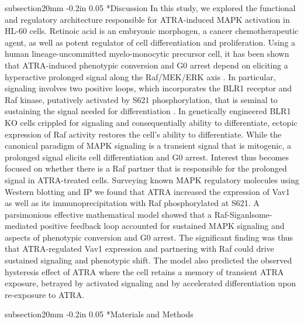 \documentclass[12pt]{article}
\makeatletter
\renewcommand\section{\@startsection
	{subsection}{2}{0mm}
	{-0.2in}
	{0.05\baselineskip}
	{\normalfont\large\bfseries}}
\makeatother
\begin{document}
\section*{Discussion}
In this study, we explored the functional and regulatory architecture responsible for ATRA-induced MAPK activation in HL-60 cells.
Retinoic acid is an embryonic morphogen, a cancer chemotherapeutic agent, as well as potent regulator of cell differentiation and proliferation. 
Using a human lineage-uncommitted myelo-monocytic precursor cell, 
it has been shown that ATRA-induced phenotypic conversion and G0 arrest depend on eliciting a hyperactive prolonged signal along the Raf/MEK/ERK axis \cite{Yen1998}. 
In particular, signaling involves two positive loops, which incorporates the BLR1 receptor and Raf kinase, putatively activated by S621 phosphorylation, 
that is seminal to sustaining the signal needed for differentiation \cite{Wang2008}. 
In genetically engineered BLR1 KO cells crippled for signaling and consequentially ability to differentiate, ectopic expression of Raf activity restores the cell's ability to differentiate. 
While the canonical paradigm of MAPK signaling is a transient signal that is mitogenic, a prolonged signal elicits cell differentiation and G0 arrest. 
Interest thus becomes focused on whether there is a Raf partner that is responsible for the prolonged signal in ATRA-treated cells. 
Surveying known MAPK regulatory molecules using Western blotting and IP we found that ATRA increased the expression of Vav1 as well as its immunoprecipitation with Raf phosphorylated at S621. 
A parsimonious effective mathematical model showed that a Raf-Siganlsome-mediated positive feedback loop accounted for sustained MAPK signaling and aspects of phenotypic conversion and G0 arrest. 
The significant finding was thus that ATRA-regulated Vav1 expression and partnering with Raf could drive sustained signaling and phenotypic shift. The model also predicted the observed hysteresis effect of ATRA where the cell retains a memory of transient ATRA exposure, betrayed by activated signaling and by accelerated differentiation upon re-exposure to ATRA.

\clearpage

\section*{Materials and Methods}
\end{document}
